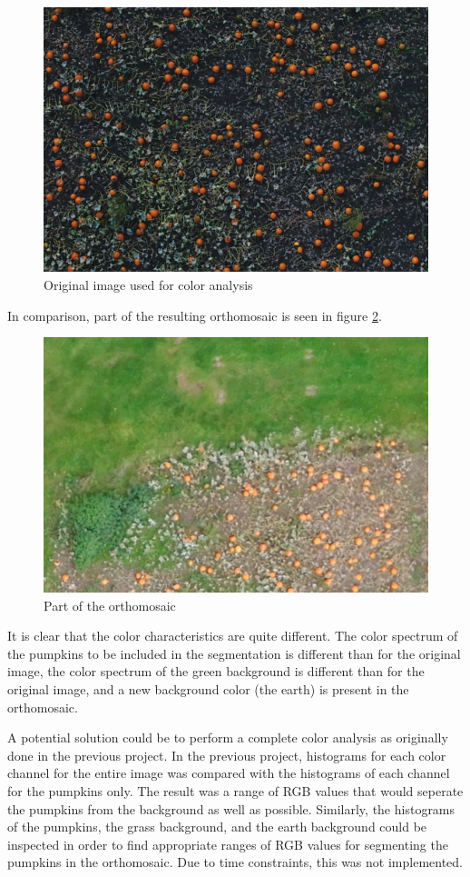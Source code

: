 \documentclass[../Head/Main.tex]{subfiles}
\begin{document}
\begin{figure}[H]
	\centering
	\includegraphics[scale=0.5]{../Figures/orig_image.png}
	\caption{Original image used for color analysis}
	\label{fig:orig_img}
\end{figure}

In comparison, part of the resulting orthomosaic is seen in figure \ref{fig:new_img}.

\begin{figure}[H]
	\centering
	\includegraphics[scale=0.6]{../Figures/new_img.png}
	\caption{Part of the orthomosaic}
	\label{fig:new_img}
\end{figure}

It is clear that the color characteristics are quite different. The color spectrum of the pumpkins to be included in the segmentation is different than for the original image, the color spectrum of the green background is different than for the original image, and a new background color (the earth) is present in the orthomosaic.\par
A potential solution could be to perform a complete color analysis as originally done in the previous project. In the previous project, histograms for each color channel for the entire image was compared with the histograms of each channel for the pumpkins only. The result was a range of RGB values that would seperate the pumpkins from the background as well as possible. Similarly, the histograms of the pumpkins, the grass background, and the earth background could be inspected in order to find appropriate ranges of RGB values for segmenting the pumpkins in the orthomosaic. Due to time constraints, this was not implemented.
\end{document}
